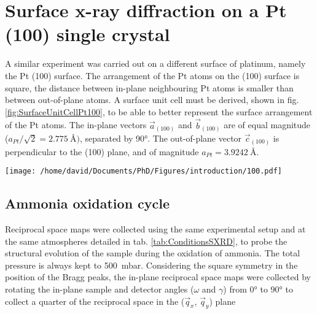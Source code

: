 \newpage
\section{Surface x-ray diffraction on a Pt (100) single crystal} \label{sec:SXRD100}


A similar experiment was carried out on a different surface of platinum, namely the Pt (100) surface.
The arrangement of the Pt atoms on the (100) surface is square, the distance between in-plane neighbouring Pt atoms is smaller than between out-of-plane atoms.
A surface unit cell must be derived, shown in fig. \ref{fig:SurfaceUnitCellPt100}, to be able to better represent the surface arrangement of the Pt atoms.
The in-plane vectors $\vec{a}_{(100)}$ and $\vec{b}_{(100)}$ are of equal magnitude ($a_{Pt} / \sqrt{2} = \qty{2.775}{\angstrom})$, separated by \ang{90}.
The out-of-plane vector $\vec{c}_{(100)}$ is perpendicular to the (100) plane, and of magnitude $a_{Pt} = \qty{3.9242}{\angstrom}$.

\begin{SCfigure}
    \centering
    \texttt{[image: /home/david/Documents/PhD/Figures/introduction/100.pdf]}
    \caption{
        Face-centered cubic unit cell of Pt with $(100)$ crystallographic plane drawn in green.
        $\vec{a}_{(100)}$, $\vec{b}_{(100)}$ and $\vec{c}_{(100)}$ are the $(100)$ surface unit cell vectors.
    }
    \label{fig:SurfaceUnitCellPt100}
\end{SCfigure}

\subsection{Ammonia oxidation cycle}

Reciprocal space maps were collected using the same experimental setup and at the same atmospheres detailed in tab. \ref{tab:ConditionsSXRD}, to probe the structural evolution of the sample during the oxidation of ammonia.
The total pressure is always kept to \qty{500}{\milli\bar}.
Considering the square symmetry in the position of the Bragg peaks, the in-plane reciprocal space maps were collected by rotating the in-plane sample and detector angles ($\omega$ and $\gamma$) from \ang{0} to \ang{90} to collect a quarter of the reciprocal space in the ($\vec{q}_x$, $\vec{q}_y$) plane

